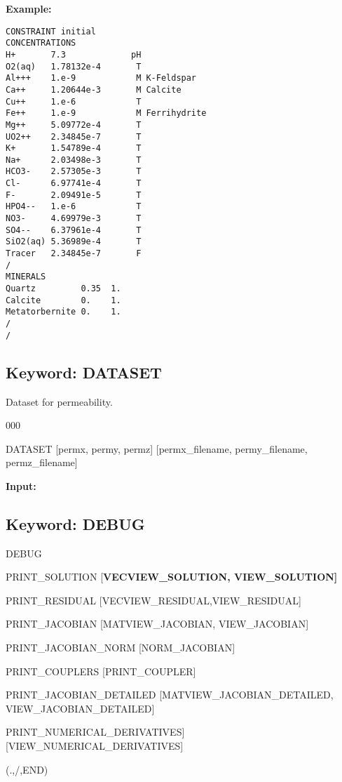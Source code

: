 \documentclass[12pt]{article}
\begin{document}
\noindent
{\bf Example:}
\begin{verbatim}
CONSTRAINT initial
CONCENTRATIONS
H+       7.3             pH
O2(aq)   1.78132e-4       T
Al+++    1.e-9            M K-Feldspar
Ca++     1.20644e-3       M Calcite
Cu++     1.e-6            T
Fe++     1.e-9            M Ferrihydrite
Mg++     5.09772e-4       T
UO2++    2.34845e-7       T
K+       1.54789e-4       T
Na+      2.03498e-3       T
HCO3-    2.57305e-3       T
Cl-      6.97741e-4       T
F-       2.09491e-5       T
HPO4--   1.e-6            T
NO3-     4.69979e-3       T
SO4--    6.37961e-4       T
SiO2(aq) 5.36989e-4       T
Tracer   2.34845e-7       F
/
MINERALS
Quartz         0.35  1.
Calcite        0.    1.
Metatorbernite 0.    1.
/
/
\end{verbatim}


\newpage
\protect\hypertarget{target_datset}{}

\subsection{Keyword: DATASET}


 Dataset for permeability.

\begin{deflist}{000}
\item[DATASET] [permx, permy, permz] [permx\_filename, permy\_filename, permz\_filename]
\end{deflist}


\newpage
\protect\hypertarget{target_dbg}{}

{\noindent\bf Input:}

\subsection{Keyword: DEBUG}
\begin{deflist}{00}
\item[DEBUG]~
\begin{deflist}{00}
\item[PRINT\_SOLUTION] [\bf VECVIEW\_SOLUTION, VIEW\_SOLUTION]
\item[PRINT\_RESIDUAL] [VECVIEW\_RESIDUAL,VIEW\_RESIDUAL]
\item[PRINT\_JACOBIAN] [MATVIEW\_JACOBIAN, VIEW\_JACOBIAN]
\item[PRINT\_JACOBIAN\_NORM] [NORM\_JACOBIAN]
\item[PRINT\_COUPLERS] [PRINT\_COUPLER]
\item[PRINT\_JACOBIAN\_DETAILED] [MATVIEW\_JACOBIAN\_DETAILED, VIEW\_JACOBIAN\_DETAILED]
\item  PRINT\_NUMERICAL\_DERIVATIVES] [VIEW\_NUMERICAL\_DERIVATIVES]
\end{deflist}
\item[(.,/,END)]
\end{deflist}
\end{document}
